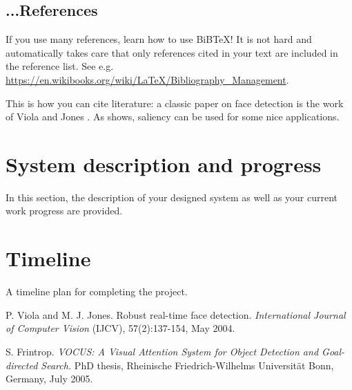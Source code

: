 \documentclass[a4paper,11pt,english]{article}
\begin{document}
\subsection{...References}
If you use many references, learn how to use BiBTeX! It is not hard and automatically takes care that only references cited in your text are included in the reference list. See e.g. \url{https://en.wikibooks.org/wiki/LaTeX/Bibliography_Management}.

This is how you can cite literature: a classic paper on face detection is the work of Viola and Jones \cite{viola_jones04}. As \cite{frintrop_phd05} shows, saliency can be used for some nice applications.


\section{System description and progress}
In this section, the description of your designed system as well as your current work progress are provided.

\section{Timeline}
A timeline plan for completing the project.

\begin{thebibliography}{99}

 P. Viola and M. J. Jones. Robust real-time face detection. \textit{International Journal of Computer Vision} (IJCV), 57(2):137-154, May 2004.

 S. Frintrop. \textit{VOCUS: A Visual Attention System for Object Detection and Goal-directed Search.} PhD thesis, Rheinische Friedrich-Wilhelms Universität Bonn, Germany, July 2005. 
\end{thebibliography}
\end{document}
